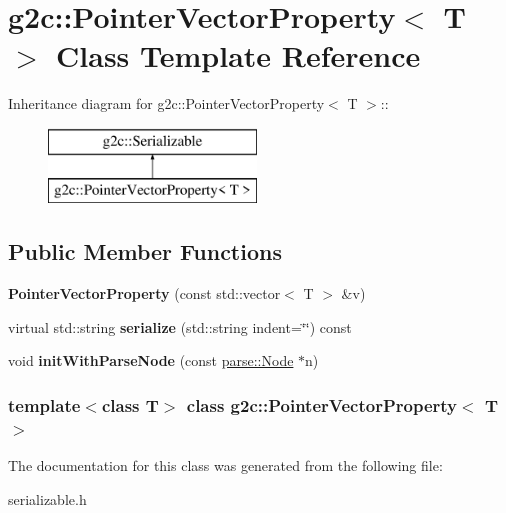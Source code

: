 \hypertarget{classg2c_1_1_pointer_vector_property}{
\section{g2c::PointerVectorProperty$<$ T $>$ Class Template Reference}
\label{classg2c_1_1_pointer_vector_property}
}
Inheritance diagram for g2c::PointerVectorProperty$<$ T $>$::\begin{figure}[H]
\begin{center}
\leavevmode
\includegraphics[height=2cm]{classg2c_1_1_pointer_vector_property}
\end{center}
\end{figure}
\subsection*{Public Member Functions}
\begin{DoxyCompactItemize}
\item 
\hypertarget{classg2c_1_1_pointer_vector_property_a491789e14f8e44a03ddda05dccd6ca14}{
{\bfseries PointerVectorProperty} (const std::vector$<$ T $>$ \&v)}
\label{classg2c_1_1_pointer_vector_property_a491789e14f8e44a03ddda05dccd6ca14}

\item 
\hypertarget{classg2c_1_1_pointer_vector_property_aa614e7b7bbf0a78a199fbe551fbcf1d8}{
virtual std::string {\bfseries serialize} (std::string indent=\char`\"{}\char`\"{}) const }
\label{classg2c_1_1_pointer_vector_property_aa614e7b7bbf0a78a199fbe551fbcf1d8}

\item 
\hypertarget{classg2c_1_1_pointer_vector_property_a905e58573f0eefe7f8ad5fd88dca2d81}{
void {\bfseries initWithParseNode} (const \hyperlink{classparse_1_1_node}{parse::Node} $\ast$n)}
\label{classg2c_1_1_pointer_vector_property_a905e58573f0eefe7f8ad5fd88dca2d81}

\end{DoxyCompactItemize}
\subsubsection*{template$<$class T$>$ class g2c::PointerVectorProperty$<$ T $>$}



The documentation for this class was generated from the following file:\begin{DoxyCompactItemize}
\item 
serializable.h\end{DoxyCompactItemize}
